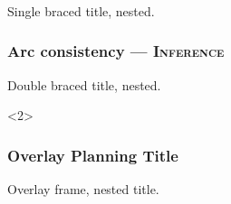\documentclass{ltx-talk}
\begin{document}
\begin{frame}[vertical-alignment=center]
\frametitle{}
Single braced title, nested.
\end{frame}

\begin{frame}[vertical-alignment=center]
\frametitle{Arc consistency --- {\scshape Inference}}
Double braced title, nested.
\end{frame}

\begin{frame}<2>
\frametitle{Overlay {Planning} Title}
Overlay frame, nested title.
\end{frame}
\end{document}
